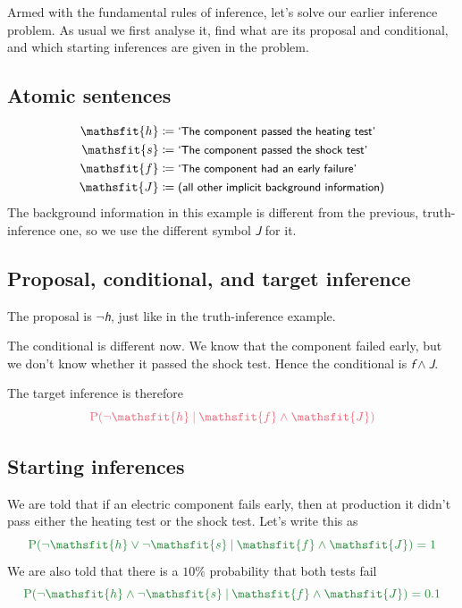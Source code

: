 \documentclass[
  a4paper,
  DIV=11,
  numbers=noendperiod,
  oneside]{scrreprt}
\begin{document}
Armed with the fundamental rules of inference, let's solve our earlier
inference problem. As usual we first analyse it, find what are its
proposal and conditional, and which starting inferences are given in the
problem.

\hypertarget{atomic-sentences-2}{%
\subsection{Atomic sentences}\label{atomic-sentences-2}}

\[
\begin{aligned}
\mathsfit{h}&\coloneqq \textsf{\small`The component passed the heating test'}
\\
\mathsfit{s}&\coloneqq \textsf{\small`The component passed the shock test'}
\\
\mathsfit{f}&\coloneqq \textsf{\small`The component had an early failure'}
\\
\mathsfit{J}&\coloneqq \textsf{\small (all other implicit background information)}
\end{aligned}
\] The background information in this example is different from the
previous, truth-inference one, so we use the different symbol
\(\mathsfit{J}\) for it.

\hypertarget{proposal-conditional-and-target-inference}{%
\subsection{Proposal, conditional, and target
inference}\label{proposal-conditional-and-target-inference}}

The proposal is \(\lnot\mathsfit{h}\), just like in the truth-inference
example.

The conditional is different now. We know that the component failed
early, but we don't know whether it passed the shock test. Hence the
conditional is \(\mathsfit{f}\land \mathsfit{J}\).

The target inference is therefore \[
\color[RGB]{238,102,119}\mathrm{P}(\lnot\mathsfit{h}\nonscript\:\vert\nonscript\:\mathopen{} \mathsfit{f}\land \mathsfit{J})
\]

\hypertarget{starting-inferences-1}{%
\subsection{Starting inferences}\label{starting-inferences-1}}

We are told that if an electric component fails early, then at
production it didn't pass either the heating test or the shock test.
Let's write this as \[
\color[RGB]{34,136,51}\mathrm{P}(\lnot\mathsfit{h}\lor \lnot\mathsfit{s}\nonscript\:\vert\nonscript\:\mathopen{} \mathsfit{f}\land \mathsfit{J}) = 1
\] We are also told that there is a \(10\%\) probability that both tests
fail \[
\color[RGB]{34,136,51}\mathrm{P}(\lnot\mathsfit{h}\land \lnot\mathsfit{s}\nonscript\:\vert\nonscript\:\mathopen{} \mathsfit{f}\land \mathsfit{J}) = 0.1
\]
\end{document}
